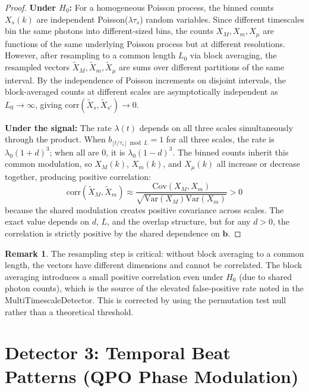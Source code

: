 \documentclass[11pt]{article}
\theoremstyle{definition}
\newtheorem{remark}[theorem]{Remark}
\begin{document}
\begin{proof}
\textbf{Under $H_0$:} For a homogeneous Poisson process, the binned counts $X_s(k)$ are independent Poisson($\lambda \tau_s$) random variables. Since different timescales bin the same photons into different-sized bins, the counts $X_M, X_m, X_\mu$ are functions of the same underlying Poisson process but at different resolutions. However, after resampling to a common length $L_0$ via block averaging, the resampled vectors $\tilde{X}_M, \tilde{X}_m, \tilde{X}_\mu$ are sums over different partitions of the same interval. By the independence of Poisson increments on disjoint intervals, the block-averaged counts at different scales are asymptotically independent as $L_0 \to \infty$, giving $\mathrm{corr}(\tilde{X}_s, \tilde{X}_{s'}) \to 0$.

\textbf{Under the signal:} The rate $\lambda(t)$ depends on all three scales simultaneously through the product. When $b_{\lfloor t/\tau_s \rfloor \bmod L} = 1$ for all three scales, the rate is $\lambda_0(1+d)^3$; when all are 0, it is $\lambda_0(1-d)^3$. The binned counts inherit this common modulation, so $X_M(k)$, $X_m(k)$, and $X_\mu(k)$ all increase or decrease together, producing positive correlation:
\begin{equation}
\mathrm{corr}(\tilde{X}_M, \tilde{X}_m) \approx \frac{\mathrm{Cov}(X_M, X_m)}{\sqrt{\mathrm{Var}(X_M)\mathrm{Var}(X_m)}} > 0
\end{equation}
because the shared modulation creates positive covariance across scales. The exact value depends on $d$, $L$, and the overlap structure, but for any $d > 0$, the correlation is strictly positive by the shared dependence on $\mathbf{b}$.
\end{proof}

\begin{remark}
The resampling step is critical: without block averaging to a common length, the vectors have different dimensions and cannot be correlated. The block averaging introduces a small positive correlation even under $H_0$ (due to shared photon counts), which is the source of the elevated false-positive rate noted in the MultiTimescaleDetector. This is corrected by using the permutation test null rather than a theoretical threshold.
\end{remark}


\section{Detector 3: Temporal Beat Patterns (QPO Phase Modulation)}
\end{document}
